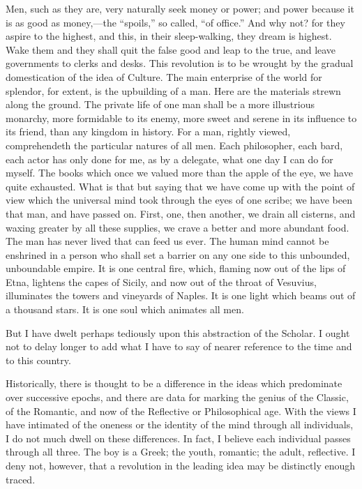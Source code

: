 Men, such as they are, very naturally seek money or power; and power
because it is as good as mon\-ey,---the ``spoils,'' so called, ``of
office.'' And why not? for they aspire to the highest, and this, in
their sleep-walking, they dream is highest. Wake them and they shall
quit the false good and leap to the true, and leave governments to
clerks and desks. This revolution is to be wrought by the gradual
domestication of the idea of Culture. The main enterprise of the world
for splendor, for extent, is the upbuilding of a man. Here are the
materials strewn along the ground. The private life of one man shall
be a more illustrious monarchy, more formidable to its enemy, more
sweet and serene in its influence to its friend, than any kingdom in
history. For  a man, rightly viewed, comprehendeth the
particular natures of all men. Each philosopher, each bard, each actor
has only done for me, as by a delegate, what one day I can do for
myself. The books which once we valued more than the apple of the eye,
we have quite exhausted. What is that but saying that we have come up
with the point of view which the universal mind took through the eyes
of one scribe; we have been that man, and have passed on. First, one,
then another, we drain all cisterns, and waxing greater by all these
supplies, we crave a better and more abundant food. The man has never
lived that can feed us ever. The human mind cannot be enshrined in a
person who shall set a barrier on any one side to this unbounded,
unboundable empire. It is one central fire, which, flaming now out of
the lips of Etna, lightens the capes of Sicily, and now out of the
throat of Vesuvius, illuminates the towers and vineyards of Naples. It
is one light which beams out of a thousand stars. It is one soul which
animates all men.

\vspace{1\baselineskip}

But I have dwelt perhaps tediously upon this abstraction of the
Scholar. I ought not to delay longer to add what I have to say of
nearer reference to the time and to this country.

Historically, there is thought to be a difference in the
ideas which predominate over successive epochs, and there are data for
marking the genius of the Classic, of the Romantic, and now of the
Reflective or Philosophical age. With the views I have intimated of
the oneness or the identity of the mind through all individuals, I do
not much dwell on these differences. In fact, I believe each
individual passes through all three. The boy is a Greek; the youth,
romantic; the adult, reflective. I deny not, however, that a
revolution in the leading idea may be distinctly enough traced.

